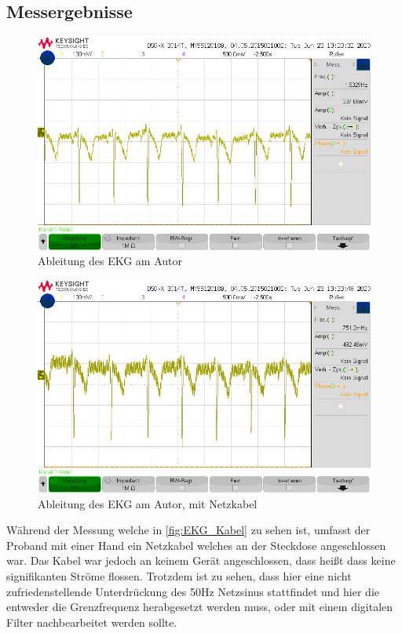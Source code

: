 \subsection{Messergebnisse}
\begin{figure}[h]
    \centering
    \includegraphics[width = \costumPicWidth]{Lab_4/Messungen/ekg.png}
    \caption{Ableitung des EKG am Autor}
    \label{fig:my_label}
\end{figure}
\begin{figure}[h]
    \centering
    \includegraphics[width = \costumPicWidth]{Lab_4/Messungen/ekg3.png}
    \caption{Ableitung des EKG am Autor, mit Netzkabel}
    \label{fig:EKG_Kabel}
\end{figure}
Während der Messung welche in \autoref{fig:EKG_Kabel} zu sehen ist, umfasst der Proband mit einer Hand ein Netzkabel welches an der Steckdose angeschlossen war. Das Kabel war jedoch an keinem Gerät angeschlossen, dass heißt dass keine signifikanten Ströme flossen. Trotzdem ist zu sehen, dass hier eine nicht zufriedenstellende Unterdrückung des 50Hz Netzsinus stattfindet und hier die entweder die Grenzfrequenz herabgesetzt werden muss, oder mit einem digitalen Filter nachbearbeitet werden sollte.

